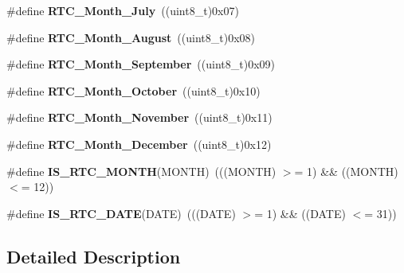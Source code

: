 \begin{DoxyCompactItemize}
\item 
\hypertarget{group___r_t_c___month___date___definitions_gac1a6c0474aeb703c29bb0f1c22011b01}{}\#define {\bfseries R\+T\+C\+\_\+\+Month\+\_\+\+July}~((uint8\+\_\+t)0x07)\label{group___r_t_c___month___date___definitions_gac1a6c0474aeb703c29bb0f1c22011b01}

\item 
\hypertarget{group___r_t_c___month___date___definitions_ga03e76764a3d7b01ef13c6cdabb6e05c8}{}\#define {\bfseries R\+T\+C\+\_\+\+Month\+\_\+\+August}~((uint8\+\_\+t)0x08)\label{group___r_t_c___month___date___definitions_ga03e76764a3d7b01ef13c6cdabb6e05c8}

\item 
\hypertarget{group___r_t_c___month___date___definitions_ga49e0cdf9d6f449872944ee63acab3dd0}{}\#define {\bfseries R\+T\+C\+\_\+\+Month\+\_\+\+September}~((uint8\+\_\+t)0x09)\label{group___r_t_c___month___date___definitions_ga49e0cdf9d6f449872944ee63acab3dd0}

\item 
\hypertarget{group___r_t_c___month___date___definitions_ga862ea2da95dd5a040ee5e6da1079ccc9}{}\#define {\bfseries R\+T\+C\+\_\+\+Month\+\_\+\+October}~((uint8\+\_\+t)0x10)\label{group___r_t_c___month___date___definitions_ga862ea2da95dd5a040ee5e6da1079ccc9}

\item 
\hypertarget{group___r_t_c___month___date___definitions_ga0d944af7d193e8bc1bbdfc8764be49cb}{}\#define {\bfseries R\+T\+C\+\_\+\+Month\+\_\+\+November}~((uint8\+\_\+t)0x11)\label{group___r_t_c___month___date___definitions_ga0d944af7d193e8bc1bbdfc8764be49cb}

\item 
\hypertarget{group___r_t_c___month___date___definitions_ga5bda2ebb05c99e18e819c8582592ac00}{}\#define {\bfseries R\+T\+C\+\_\+\+Month\+\_\+\+December}~((uint8\+\_\+t)0x12)\label{group___r_t_c___month___date___definitions_ga5bda2ebb05c99e18e819c8582592ac00}

\item 
\hypertarget{group___r_t_c___month___date___definitions_ga7fa60f17b2ae529c35b1fa3dd4d6853f}{}\#define {\bfseries I\+S\+\_\+\+R\+T\+C\+\_\+\+M\+O\+N\+T\+H}(M\+O\+N\+T\+H)~(((M\+O\+N\+T\+H) $>$= 1) \&\& ((M\+O\+N\+T\+H) $<$= 12))\label{group___r_t_c___month___date___definitions_ga7fa60f17b2ae529c35b1fa3dd4d6853f}

\item 
\hypertarget{group___r_t_c___month___date___definitions_ga3b6e966e144cb0495563ef0283d16510}{}\#define {\bfseries I\+S\+\_\+\+R\+T\+C\+\_\+\+D\+A\+T\+E}(D\+A\+T\+E)~(((D\+A\+T\+E) $>$= 1) \&\& ((D\+A\+T\+E) $<$= 31))\label{group___r_t_c___month___date___definitions_ga3b6e966e144cb0495563ef0283d16510}

\end{DoxyCompactItemize}


\subsection{Detailed Description}
